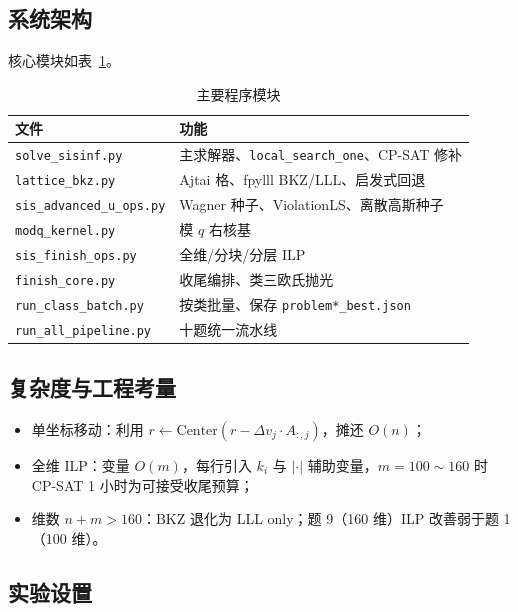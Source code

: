 \documentclass[12pt,a4paper]{ctexart}
\begin{document}
\subsection{系统架构}

核心模块如表~\ref{tab:modules}。

\begin{table}[htbp]
  \centering
  \caption{主要程序模块}
  \label{tab:modules}
  \small
  \begin{tabular}{ll}
    \toprule
    文件 & 功能 \\
    \midrule
    \texttt{solve\_sisinf.py} & 主求解器、\texttt{local\_search\_one}、CP-SAT 修补 \\
    \texttt{lattice\_bkz.py} & Ajtai 格、fpylll BKZ/LLL、启发式回退 \\
    \texttt{sis\_advanced\_u\_ops.py} & Wagner 种子、ViolationLS、离散高斯种子 \\
    \texttt{modq\_kernel.py} & 模 $q$ 右核基 \\
    \texttt{sis\_finish\_ops.py} & 全维/分块/分层 ILP \\
    \texttt{finish\_core.py} & 收尾编排、类三欧氏抛光 \\
    \texttt{run\_class\_batch.py} & 按类批量、保存 \texttt{problem*\_best.json} \\
    \texttt{run\_all\_pipeline.py} & 十题统一流水线 \\
    \bottomrule
  \end{tabular}
\end{table}

\subsection{复杂度与工程考量}

\begin{itemize}
  \item 单坐标移动：利用 $r\leftarrow \mathrm{Center}(r-\Delta v_j\cdot A_{:,j})$，摊还 $O(n)$；
  \item 全维 ILP：变量 $O(m)$，每行引入 $k_i$ 与 $|\cdot|$ 辅助变量，$m=100\sim160$ 时 CP-SAT 1 小时为可接受收尾预算；
  \item 维数 $n+m>160$：BKZ 退化为 LLL only；题 9（160 维）ILP 改善弱于题 1（100 维）。
\end{itemize}

\subsection{实验设置}
\end{document}
